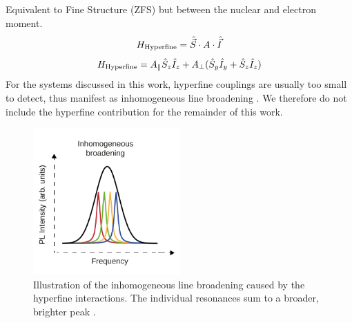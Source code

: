 \subsection{}
Equivalent to Fine Structure (ZFS) but between the nuclear and electron moment.
\begin{equation}
	H_{\ce{Hyperfine}} = \hat{\vec{S}} \cdot A \cdot \hat{\vec{I}}
	\label{eq:hyperfine_hamiltonian_dense}
\end{equation}
\begin{equation}
	H_{\ce{Hyperfine}} = A_\parallel \hat{S}_z\hat{I}_z + A_\perp(\hat{S}_y\hat{I}_y + \hat{S}_z\hat{I}_z)
	\label{eq:hyperfine_hamiltonian_componentwise}
\end{equation}
For the systems discussed in this work, hyperfine couplings are usually too small to detect,
thus manifest as inhomogeneous line broadening \cite{SpinStates}. We therefore do not include the hyperfine contribution
for the remainder of this work.
 \begin{figure}[H]
    \begin{center}
        \includegraphics[width=0.5\textwidth]{figures/inhom-broadening.pdf}
	\caption{Illustration of the inhomogeneous line broadening caused by the hyperfine interactions. The individual resonances sum to a broader, brighter peak \cite{Rain2022}.}\label{fig:}
    \end{center}
\end{figure}



